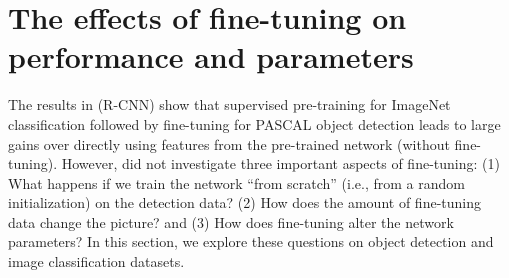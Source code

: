\section{The effects of fine-tuning on performance and parameters}
\label{sec:fine}


The results in \cite{Rcnn} (R-CNN) show that supervised pre-training for ImageNet classification followed by fine-tuning for PASCAL object detection leads to large gains over directly using features from the pre-trained network (without fine-tuning).
However, \cite{Rcnn} did not investigate three important aspects of fine-tuning: (1) What happens if we train the network ``from scratch'' (i.e., from a random initialization) on the detection data? (2) How does the amount of fine-tuning data change the picture? and (3) How does fine-tuning alter the network parameters?
In this section, we explore these questions on object detection and image classification datasets.


